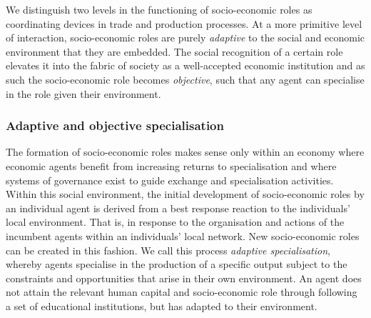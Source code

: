 We distinguish two levels in the functioning of socio-economic roles as coordinating devices in trade and production processes. At a more primitive level of interaction, socio-economic roles are purely \emph{adaptive} to the social and economic environment that they are embedded. The social recognition of a certain role elevates it into the fabric of society as a well-accepted economic institution and as such the socio-economic role becomes \emph{objective}, such that any agent can specialise in the role given their environment.

\subsubsection{Adaptive and objective specialisation}

The formation of socio-economic roles makes sense only within an economy where economic agents benefit from increasing returns to specialisation and where systems of governance exist to guide exchange and specialisation activities. Within this social environment, the initial development of socio-economic roles by an individual agent is derived from a best response reaction to the individuals' local environment. That is, in response to the organisation and actions of the incumbent agents within an individuals' local network. New socio-economic roles can be created in this fashion. We call this process \emph{adaptive specialisation}, whereby agents specialise in the production of a specific output subject to the constraints and opportunities that arise in their own environment. An agent does not attain the relevant human capital and socio-economic role through following a set of educational institutions, but has adapted to their environment.

